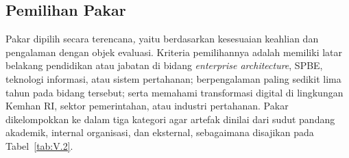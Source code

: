 \subsection{Pemilihan Pakar}
\label{sec:V.1.2}

Pakar dipilih secara terencana\textit{,} yaitu berdasarkan kesesuaian keahlian dan pengalaman dengan objek evaluasi. Kriteria pemilihannya adalah memiliki latar belakang pendidikan atau jabatan di bidang \textit{enterprise architecture}, SPBE, teknologi informasi, atau sistem pertahanan; berpengalaman paling sedikit lima tahun pada bidang tersebut; serta memahami transformasi digital di lingkungan Kemhan RI, sektor pemerintahan, atau industri pertahanan. Pakar dikelompokkan ke dalam tiga kategori agar artefak dinilai dari sudut pandang akademik, internal organisasi, dan eksternal, sebagaimana disajikan pada Tabel~\ref{tab:V.2}.

